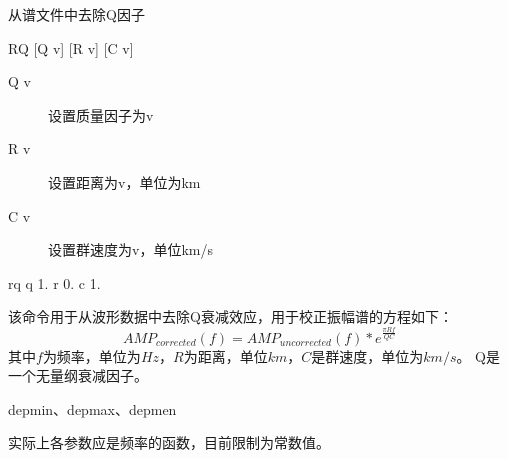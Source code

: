 \label{cmd:rq}

从谱文件中去除Q因子

\begin{SACSTX}
RQ [Q v] [R v] [C v]
\end{SACSTX}

\begin{description}
\item [Q v] 设置质量因子为v
\item [R v] 设置距离为v，单位为km
\item [C v] 设置群速度为v，单位km/s
\end{description}

\begin{SACDFT}
rq q 1. r 0. c 1.
\end{SACDFT}

该命令用于从波形数据中去除Q衰减效应，用于校正振幅谱的方程如下：
\[ AMP_{corrected}(f) = AMP_{uncorrected}(f) * e^{\frac{\pi R f}{Q C}} \]
其中$f$为频率，单位为$Hz$，$R$为距离，单位$km$，$C$是群速度，单位为$km/s$。
Q是一个无量纲衰减因子。

depmin、depmax、depmen

实际上各参数应是频率的函数，目前限制为常数值。
